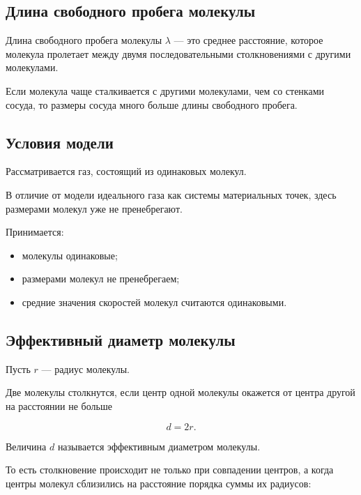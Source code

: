 \documentclass[a4paper,12pt]{article}
\begin{document}
\subsection*{Длина свободного пробега молекулы}

\begin{definitionbox}
Длина свободного пробега молекулы $\lambda$ — это среднее расстояние, которое молекула пролетает между двумя последовательными столкновениями с другими молекулами.
\end{definitionbox}

Если молекула чаще сталкивается с другими молекулами, чем со стенками сосуда, то размеры сосуда много больше длины свободного пробега.

\subsection*{Условия модели}

Рассматривается газ, состоящий из одинаковых молекул.

В отличие от модели идеального газа как системы материальных точек, здесь размерами молекул уже не пренебрегают.

Принимается:

\begin{itemize}
    \item молекулы одинаковые;
    \item размерами молекул не пренебрегаем;
    \item средние значения скоростей молекул считаются одинаковыми.
\end{itemize}

\subsection*{Эффективный диаметр молекулы}

Пусть $r$ — радиус молекулы.

Две молекулы столкнутся, если центр одной молекулы окажется от центра другой на расстоянии не больше

\[
d=2r.
\]

\begin{definitionbox}
Величина $d$ называется эффективным диаметром молекулы.
\end{definitionbox}

То есть столкновение происходит не только при совпадении центров, а когда центры молекул сблизились на расстояние порядка суммы их радиусов:
\end{document}
